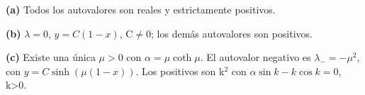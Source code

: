 \noindent\textbf{(a)} Todos los autovalores son reales y estrictamente positivos.

\noindent\textbf{(b)} \(\lambda=0\), \(y=C(1-x)\), C\ensuremath{\ne}0; los demás autovalores son positivos.

\noindent\textbf{(c)} Existe una única \(\mu>0\) con \(\alpha=\mu\coth\mu\).
El autovalor negativo es \(\lambda_-=-\mu^2\), con \(y=C\sinh(\mu(1-x))\).
Los positivos son k\ensuremath{^{2}} con \(\alpha\sin k-k\cos k=0\), k>0.
